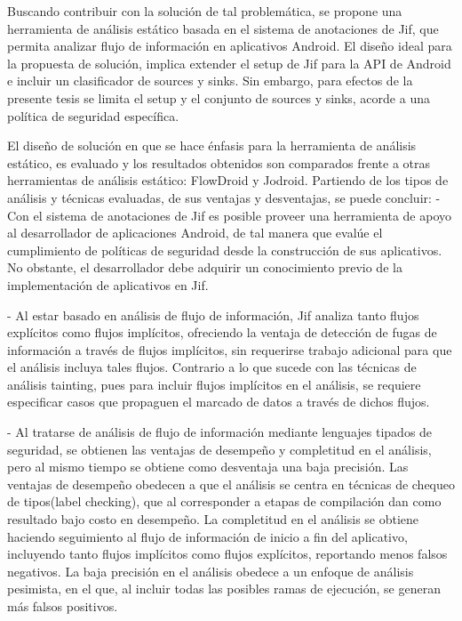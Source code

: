 Buscando contribuir con la solución de tal problemática, se propone una
herramienta de análisis estático basada en el sistema de anotaciones de Jif, que
permita analizar flujo de información en aplicativos Android. El diseño ideal
para la propuesta de solución, implica extender el setup de Jif para la API de
Android e incluir un clasificador de sources y sinks. Sin embargo, para efectos
de la presente tesis se limita el setup y el conjunto de sources y sinks, acorde
a una política de seguridad específica.

El diseño de solución en que se hace énfasis para la herramienta de análisis
estático, es evaluado y los resultados obtenidos son comparados frente a otras
herramientas de análisis estático: FlowDroid y Jodroid. Partiendo de los tipos
de análisis y técnicas evaluadas, de sus ventajas y desventajas, se
puede concluir:\newline 
- Con el sistema de anotaciones de Jif es posible proveer una
herramienta de apoyo al desarrollador de aplicaciones Android, de tal manera que evalúe el
cumplimiento de políticas de seguridad desde la construcción de sus aplicativos.\\
No obstante, el desarrollador debe adquirir un conocimiento previo de la
implementación de aplicativos en Jif.

- Al estar basado en análisis de flujo de información, Jif analiza tanto flujos
explícitos como flujos implícitos, ofreciendo la ventaja de detección de fugas
de información a través de flujos implícitos, sin requerirse trabajo adicional
para que el análisis incluya tales flujos. Contrario a lo que sucede con las
técnicas de análisis tainting, pues para incluir flujos implícitos en el
análisis, se requiere especificar casos que propaguen el marcado de datos a
través de dichos flujos.

- Al tratarse de análisis de flujo de información mediante lenguajes tipados de
seguridad, se obtienen las ventajas de desempeño y completitud en el análisis,
pero al mismo tiempo se obtiene como desventaja una baja precisión.\newline 
Las ventajas de desempeño obedecen a que el análisis se centra en técnicas de
chequeo de tipos(label checking), que al corresponder a etapas de compilación
dan como resultado bajo costo en desempeño.\newline
La completitud en el análisis se obtiene  haciendo seguimiento al flujo de
información de inicio a fin del aplicativo\cite{LanguageIFS-2013}, incluyendo
tanto flujos implícitos como flujos explícitos, reportando menos falsos negativos.\newline
La baja precisión en el análisis obedece a un enfoque de análisis pesimista,
en el que, al incluir todas las posibles ramas de ejecución, se generan más
falsos positivos.

